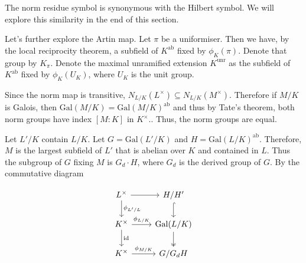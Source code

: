 \documentclass[a4paper, 12pt,oneside,openany]{book}
\begin{document}

The norm residue symbol is synonymous with the Hilbert symbol. We will explore this similarity in the end of this section.

Let's further explore the Artin map. Let $\pi$ be a uniformiser. Then we have, by the local reciprocity theorem, a subfield of $K^{\text{ab}}$ fixed by $\phi_K(\pi)$. Denote that group by $K_\pi$. Denote the maximal unramified extension $K^{\text{unr}}$ as the subfield of $K^{\text{ab}}$ fixed by $\phi_K(U_K)$, where $U_K$ is the unit group. 



 Since the norm map is transitive, $N_{L/K}(L^\times) \subseteq N_{L/K}(M^\times)$. Therefore if $M/K$ is Galois, then $\text{Gal}(M/K) = \text{Gal}(M/K)^{\text{ab}}$ and thus by Tate's theorem, both norm groups have index $[M:K]$ in $K^\times$.. Thus, the norm groups are equal.

Let $L'/K$ contain $L/K$. Let $G=\text{Gal}(L'/K)$ and $H=\text{Gal}(L/K)^{\text{ab}}$. Therefore, $M$ is the largest subfield of $L'$ that is abelian over $K$ and contained in $L$. Thus the subgroup of $G$ fixing $M$ is $G_d \cdot H$, where $G_d$ is the derived group of $G$. By the commutative diagram

\[
\begin{tikzcd}
L^\times  \arrow{r}\arrow{d}{\phi_{L'/L}} &H/H' \arrow[d, hook] \\
K^\times  \arrow{r}{\phi_{L/K}} \arrow{d}{\text{id}} &\text{Gal}(L/K) \arrow[d, two heads]\\
K^\times \arrow{r}{\phi_{M/K}} &G/G_dH
\end{tikzcd}
\]
\end{document}
